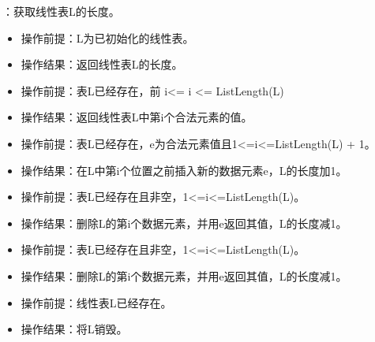 \documentclass[b5paper,11pt]{article}
\begin{document}
：获取线性表L的长度。
\begin{itemize}
  \item[] \hspace{1.5em}操作前提：L为已初始化的线性表。
  \item[] \hspace{1.5em}操作结果：返回线性表L的长度。
\end{itemize}

\begin{itemize}
  \item[] \hspace{1.5em}操作前提：表L已经存在，前 i<= i <= ListLength(L)
  \item[] \hspace{1.5em}操作结果：返回线性表L中第i个合法元素的值。
\end{itemize}

\begin{itemize}
  \item[] \hspace{1.5em}操作前提：表L已经存在，e为合法元素值且1<=i<=ListLength(L) + 1。
  \item[] \hspace{1.5em}操作结果：在L中第i个位置之前插入新的数据元素e，L的长度加1。
\end{itemize}

\begin{itemize}
  \item[] \hspace{1.5em}操作前提：表L已经存在且非空，1<=i<=ListLength(L)。
  \item[] \hspace{1.5em}操作结果：删除L的第i个数据元素，并用e返回其值，L的长度减1。
\end{itemize}

\begin{itemize}
  \item[] \hspace{1.5em}操作前提：表L已经存在且非空，1<=i<=ListLength(L)。
  \item[] \hspace{1.5em}操作结果：删除L的第i个数据元素，并用e返回其值，L的长度减1。
\end{itemize}

\begin{itemize}
  \item[] \hspace{1.5em}操作前提：线性表L已经存在。
  \item[] \hspace{1.5em}操作结果：将L销毁。
\end{itemize}
\end{document}

